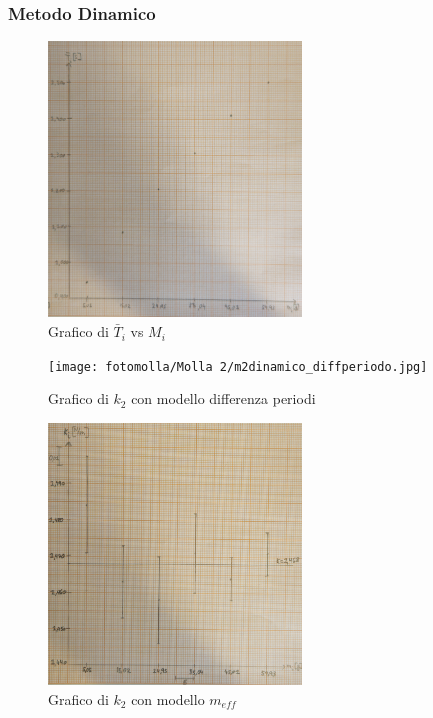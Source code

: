 \documentclass[a4paper]{article}
\begin{document}
{\subsubsection{Metodo Dinamico}
\begin{figure}[!ht]
    \centering
    \includegraphics[width=0.6\textwidth]{fotomolla/Molla 2/m2dinamico_tm.jpg}
    \caption{Grafico di $\bar{T}_i$ vs $M_i$}
\end{figure}

\begin{figure}[!ht]
    \centering
    \texttt{[image: fotomolla/Molla 2/m2dinamico\_diffperiodo.jpg]}
    \caption{Grafico di $k_2$ con modello differenza periodi}
\end{figure}

\begin{figure}[!ht]
    \centering
    \includegraphics[width=0.6\textwidth]{fotomolla/Molla 2/m2dinamico_mefficace.jpg}
    \caption{Grafico di $k_2$ con modello $m_{eff}$}
\end{figure}
\FloatBarrier

}
\end{document}

